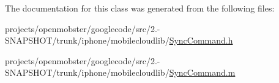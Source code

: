 \-The documentation for this class was generated from the following files\-:\begin{DoxyCompactItemize}
\item 
projects/openmobster/googlecode/src/2.-\/\-S\-N\-A\-P\-S\-H\-O\-T/trunk/iphone/mobilecloudlib/\hyperlink{_sync_command_8h}{\-Sync\-Command.\-h}\item 
projects/openmobster/googlecode/src/2.-\/\-S\-N\-A\-P\-S\-H\-O\-T/trunk/iphone/mobilecloudlib/\hyperlink{_sync_command_8m}{\-Sync\-Command.\-m}\end{DoxyCompactItemize}
